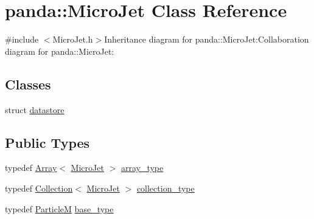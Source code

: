 \hypertarget{classpanda_1_1MicroJet}{
\section{panda::MicroJet Class Reference}
\label{classpanda_1_1MicroJet}
}


{\ttfamily \#include $<$MicroJet.h$>$}Inheritance diagram for panda::MicroJet:Collaboration diagram for panda::MicroJet:\subsection*{Classes}
\begin{DoxyCompactItemize}
\item 
struct \hyperlink{structpanda_1_1MicroJet_1_1datastore}{datastore}
\end{DoxyCompactItemize}
\subsection*{Public Types}
\begin{DoxyCompactItemize}
\item 
typedef \hyperlink{classpanda_1_1Array}{Array}$<$ \hyperlink{classpanda_1_1MicroJet}{MicroJet} $>$ \hyperlink{classpanda_1_1MicroJet_ac1892a7cfd937c8967fce27bcff9cdc7}{array\_\-type}
\item 
typedef \hyperlink{classpanda_1_1Collection}{Collection}$<$ \hyperlink{classpanda_1_1MicroJet}{MicroJet} $>$ \hyperlink{classpanda_1_1MicroJet_a07385bfbc6560036a2f568b073183df9}{collection\_\-type}
\item 
typedef \hyperlink{classpanda_1_1ParticleM}{ParticleM} \hyperlink{classpanda_1_1MicroJet_a2d604c4fa862edcde48e188002052ece}{base\_\-type}
\end{DoxyCompactItemize}
